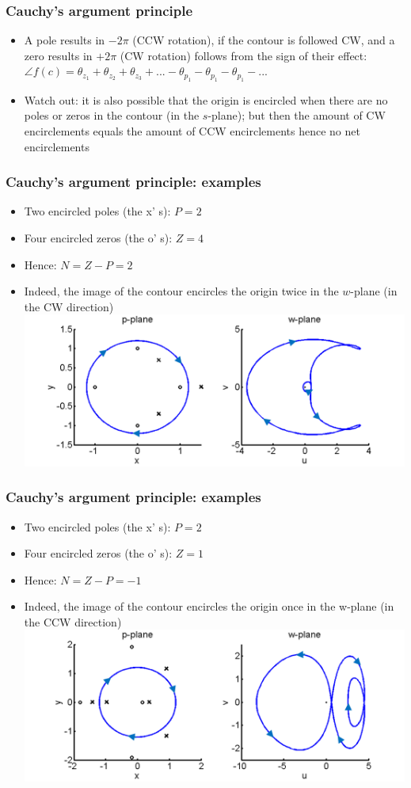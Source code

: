 \begin{frame}
\frametitle{Cauchy’s argument principle}
\begin{itemize}
\item A pole results in $-2\pi$ (CCW rotation), if the contour is followed CW, and a zero results in $+2\pi$ (CW rotation) follows from the sign of their effect: \\$ \angle f(c) = \theta_{z_1} + \theta_{z_2}+\theta_{z_3}+...-\theta_{p_1} - \theta_{p_1} - \theta_{p_1}-... $ 
\item Watch out: it is also possible that the origin is encircled when there are no poles or zeros in the contour (in the $s$-plane); but then the amount of CW encirclements equals the amount of CCW encirclements hence no net encirclements
\end{itemize}
\end{frame}

\begin{frame}
\frametitle{Cauchy’s argument principle: examples}
\begin{itemize}
\item Two encircled poles (the x' s): $P=2$
\item Four encircled zeros (the o' s): $Z=4$
\item Hence: $N= Z-P= 2$
\item Indeed, the image of the contour encircles the origin twice in the $w$-plane (in the CW direction)
\includegraphics[width=0.9\linewidth]{Afbeelding6}
\end{itemize}
\end{frame}

\begin{frame}
\frametitle{Cauchy’s argument principle: examples}
\begin{itemize}
\item Two encircled poles (the x' s): $P=2$
\item Four encircled zeros (the o' s): $Z=1$
\item Hence: $N= Z-P= -1$
\item Indeed, the image of the contour encircles the origin once in the w-plane (in the CCW direction)
\includegraphics[width=0.9\linewidth]{Afbeelding7}
\end{itemize}
\end{frame}

